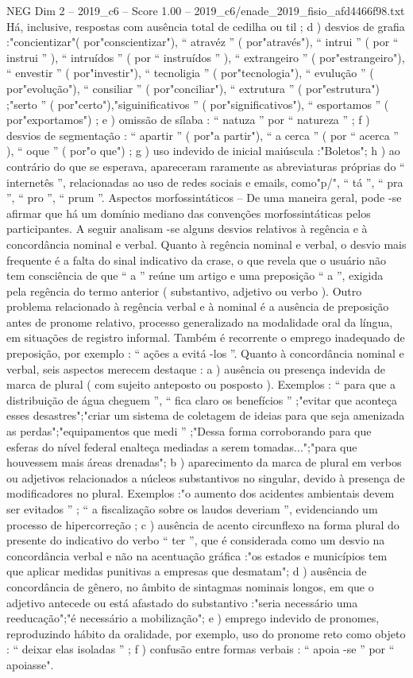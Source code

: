 \begin{textsample}{NEG Dim 2 – 2019\_c6 – Score 1.00 – 2019\_c6/enade\_2019\_fisio\_afd4466f98.txt}
Há, inclusive, respostas com ausência total de cedilha ou til ; d ) desvios de grafia :"concientizar"( por"conscientizar"), “ atravéz ” ( por"através"), “ intrui ” ( por “ instrui ” ), “ intruídos ” ( por “ instruídos ” ), “ extrangeiro ” ( por"estrangeiro"), “ envestir ” ( por"investir"), “ tecnoligia ” ( por"tecnologia"), “ evulução ” ( por"evolução"), “ consiliar ” ( por"conciliar"), “ extrutura ” ( por"estrutura") ;"serto ” ( por"certo"),"siguinificativos ” ( por"significativos"), “ esportamos ” ( por"exportamos") ; e ) omissão de sílaba : “ natuza ” por “ natureza ” ; f ) desvios de segmentação : “ apartir ” ( por"a partir"), “ a cerca ” ( por “ acerca ” ), “ oque ” ( por"o que") ; g ) uso indevido de inicial maiúscula :"Boletos"; h ) ao contrário do que se esperava, apareceram raramente as abreviaturas próprias do “ internetês ”, relacionadas ao uso de redes sociais e emails, como"p/", “ tá ”, “ pra ”, “ pro ”, “ prum ”.
Aspectos morfossintáticos – De uma maneira geral, pode -se afirmar que há um domínio mediano das convenções morfossintáticas pelos participantes.
A seguir analisam -se alguns desvios relativos à regência e à concordância nominal e verbal.
Quanto à regência nominal e verbal, o desvio mais frequente é a falta do sinal indicativo da crase, o que revela que o usuário não tem consciência de que “ a ” reúne um artigo e uma preposição “ a ”, exigida pela regência do termo anterior ( substantivo, adjetivo ou verbo ).
Outro problema relacionado à regência verbal e à nominal é a ausência de preposição antes de pronome relativo, processo generalizado na modalidade oral da língua, em situações de registro informal.
Também é recorrente o emprego inadequado de preposição, por exemplo : “ ações a evitá -los ”.
Quanto à concordância nominal e verbal, seis aspectos merecem destaque : a ) ausência ou presença indevida de marca de plural ( com sujeito anteposto ou posposto ).
Exemplos : “ para que a distribuição de água cheguem ”, “ fica claro os benefícios ” ;"evitar que aconteça esses desastres";"criar um sistema de coletagem de ideias para que seja amenizada as perdas";"equipamentos que medi ” ;"Dessa forma corroborando para que esferas do nível federal enalteça mediadas a serem tomadas...";"para que houvessem mais áreas drenadas"; b ) aparecimento da marca de plural em verbos ou adjetivos relacionados a núcleos substantivos no singular, devido à presença de modificadores no plural.
Exemplos :"o aumento dos acidentes ambientais devem ser evitados ” ; “ a fiscalização sobre os laudos deveriam ”, evidenciando um processo de hipercorreção ; c ) ausência de acento circunflexo na forma plural do presente do indicativo do verbo “ ter ”, que é considerada como um desvio na concordância verbal e não na acentuação gráfica :"os estados e municípios tem que aplicar medidas punitivas a empresas que desmatam"; d ) ausência de concordância de gênero, no âmbito de sintagmas nominais longos, em que o adjetivo antecede ou está afastado do substantivo :"seria necessário uma reeducação";"é necessário a mobilização"; e ) emprego indevido de pronomes, reproduzindo hábito da oralidade, por exemplo, uso do pronome reto como objeto : “ deixar elas isoladas ” ; f ) confusão entre formas verbais : “ apoia -se ” por “ apoiasse".

\end{textsample}
